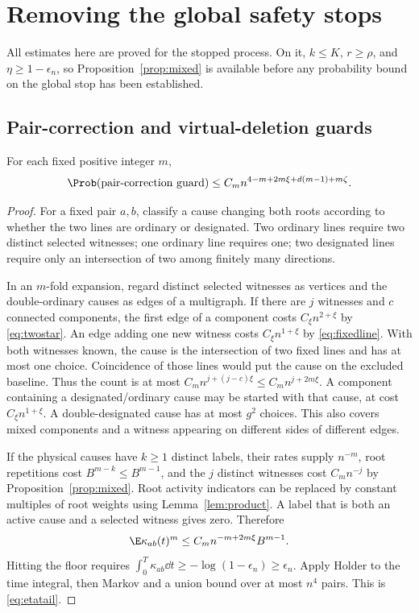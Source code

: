 \section{Removing the global safety stops}\label{sec:global}

All estimates here are proved for the stopped process. On it,
\(k\le K\), \(r\ge\rho\), and \(\eta\ge1-\epsilon_n\), so
Proposition~\ref{prop:mixed} is available before any probability bound
on the global stop has been established.

\subsection{Pair-correction and virtual-deletion guards}
\begin{lemma}\label{lem:etatail}
For each fixed positive integer \(m\),
\begin{equation}\label{eq:etatail}
 \Prob(\text{pair-correction guard})
 \le C_m n^{4-m+2m\xi+d(m-1)+m\zeta}.
\end{equation}
\end{lemma}
\begin{proof}
For a fixed pair \(a,b\), classify a cause changing both roots
according to whether the two lines are ordinary or designated.
Two ordinary lines require two distinct selected witnesses; one
ordinary line requires one; two designated lines require only an
intersection of two among finitely many directions.

In an \(m\)-fold expansion, regard distinct selected witnesses as
vertices and the double-ordinary causes as edges of a multigraph.
If there are \(j\) witnesses and \(c\) connected components, the
first edge of a component costs \(C_\xi n^{2+\xi}\) by
\eqref{eq:twostar}. An edge adding one new witness costs
\(C_\xi n^{1+\xi}\) by \eqref{eq:fixedline}. With both witnesses
known, the cause is the intersection of two fixed lines and has at
most one choice. Coincidence of those lines would put the cause on
the excluded baseline. Thus the count is at most
\(C_m n^{j+(j-c)\xi}\le C_m n^{j+2m\xi}\).
A component containing a designated/ordinary cause may be started
with that cause, at cost \(C_\xi n^{1+\xi}\). A double-designated
cause has at most \(g^2\) choices. This also covers mixed components
and a witness appearing on different sides of different edges.

If the physical causes have \(k\ge1\) distinct labels, their rates
supply \(n^{-m}\), root repetitions cost
\(B^{m-k}\le B^{m-1}\), and the \(j\) distinct witnesses cost
\(C_m n^{-j}\) by Proposition~\ref{prop:mixed}. Root activity
indicators can be replaced by constant multiples of root weights
using Lemma~\ref{lem:product}. A label that is both an active cause
and a selected witness gives zero. Therefore
\[
 \E\kappa_{ab}(t)^m\le C_m n^{-m+2m\xi}B^{m-1}.
\]
Hitting the floor requires
\(\int_0^T\kappa_{ab}\dd t\ge-\log(1-\epsilon_n)\ge\epsilon_n\).
Apply Holder to the time integral, then Markov and a union bound
over at most \(n^4\) pairs. This is \eqref{eq:etatail}.
\end{proof}

